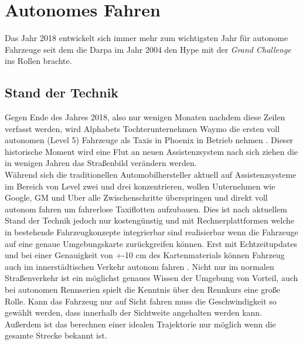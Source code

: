 \documentclass{like}
\begin{document}
  








\setcounter{page}{1}   %

\chapter{Autonomes Fahren}
Das Jahr 2018 entwickelt sich immer mehr zum wichtigsten Jahr für autonome Fahrzeuge seit dem die Darpa im Jahr 2004 den Hype mit der \emph{Grand Challenge} ins Rollen brachte. 


\section{Stand der Technik}



Gegen Ende des Jahres 2018, also nur wenigen Monaten nachdem diese Zeilen verfasst werden, wird Alphabets Tochterunternehmen Waymo die ersten voll autonomen (Level 5) Fahrzeuge als Taxis in Phoenix in Betrieb nehmen \cite{Waymo}. Dieser historische Moment wird eine Flut an neuen Assistenzsystem nach sich ziehen die in wenigen Jahren das Straßenbild verändern werden. \\
Während sich die traditionellen Automobilhersteller aktuell auf Assistenzsysteme im Bereich von Level zwei und drei konzentrieren, wollen Unternehmen wie Google, GM und Uber alle Zwischenschritte überspringen und direkt voll autonom fahren um fahrerlose Taxiflotten aufzubauen. Dies ist nach aktuellem Stand der Technik jedoch nur kostengünstig und mit Rechnerplattformen welche in bestehende Fahrzeugkonzepte integrierbar sind realisierbar wenn die Fahrzeuge auf eine genaue Umgebungskarte zurückgreifen können. Erst mit Echtzeitupdates und bei einer Genauigkeit von +-10 cm des Kartenmaterials können Fahrzeug auch im innerstädtischen Verkehr autonom fahren \cite{SEIF2016159}. 
Nicht nur im normalen Straßenverkehr ist ein möglichst genaues Wissen der Umgebung von Vorteil, auch bei autonomen Rennserien spielt die Kenntnis über den Rennkurs eine große Rolle. Kann das Fahrzeug nur auf Sicht fahren muss die Geschwindigkeit so gewählt werden, dass innerhalb der Sichtweite angehalten werden kann. Außerdem ist das berechnen einer idealen Trajektorie nur möglich wenn die gesamte Strecke bekannt ist.
\end{document}
